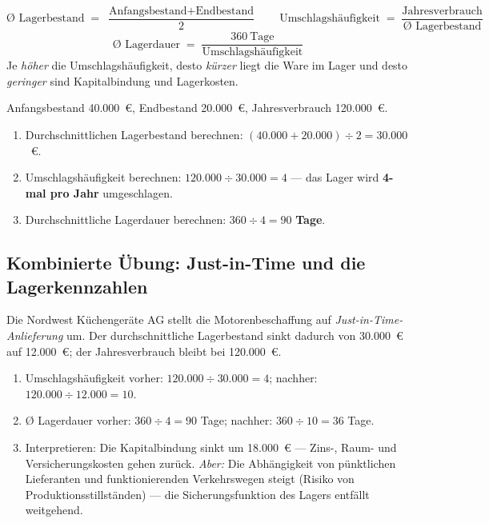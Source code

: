 \documentclass[11pt, a4paper]{article}
\begin{document}
\begin{merksatz}[title={\bfseries Formeln: Lagerkennzahlen}]
\[
\text{Ø Lagerbestand} \;=\; \frac{\text{Anfangsbestand} + \text{Endbestand}}{2}
\qquad
\text{Umschlagshäufigkeit} \;=\; \frac{\text{Jahresverbrauch}}{\text{Ø Lagerbestand}}
\]
\[
\text{Ø Lagerdauer} \;=\; \frac{360\ \text{Tage}}{\text{Umschlagshäufigkeit}}
\]
Je \emph{höher} die Umschlagshäufigkeit, desto \emph{kürzer} liegt die Ware im Lager
und desto \emph{geringer} sind Kapitalbindung und Lagerkosten.
\end{merksatz}

\begin{beispiel}
Anfangsbestand 40.000~€, Endbestand 20.000~€, Jahresverbrauch 120.000~€.
\begin{enumerate}
  \item Durchschnittlichen Lagerbestand berechnen:
    $(40.000 + 20.000) \div 2 = 30.000$~€.
  \item Umschlagshäufigkeit berechnen: $120.000 \div 30.000 = 4$ ---
    das Lager wird \textbf{4-mal pro Jahr} umgeschlagen.
  \item Durchschnittliche Lagerdauer berechnen: $360 \div 4 = 90$ \textbf{Tage}.
\end{enumerate}
\end{beispiel}

\subsection{Kombinierte Übung: Just-in-Time und die Lagerkennzahlen}

\begin{beispiel}
Die Nordwest Küchengeräte AG stellt die Motorenbeschaffung auf
\emph{Just-in-Time-Anlieferung} um. Der durchschnittliche Lagerbestand sinkt dadurch
von 30.000~€ auf 12.000~€; der Jahresverbrauch bleibt bei 120.000~€.
\begin{enumerate}
  \item Umschlagshäufigkeit vorher: $120.000 \div 30.000 = 4$; nachher:
    $120.000 \div 12.000 = 10$.
  \item Ø Lagerdauer vorher: $360 \div 4 = 90$ Tage; nachher: $360 \div 10 = 36$ Tage.
  \item Interpretieren: Die Kapitalbindung sinkt um 18.000~€ --- Zins-, Raum- und
    Versicherungskosten gehen zurück. \emph{Aber:} Die Abhängigkeit von pünktlichen
    Lieferanten und funktionierenden Verkehrswegen steigt (Risiko von
    Produktionsstillständen) --- die Sicherungsfunktion des Lagers entfällt weitgehend.
\end{enumerate}
\end{beispiel}
\end{document}
